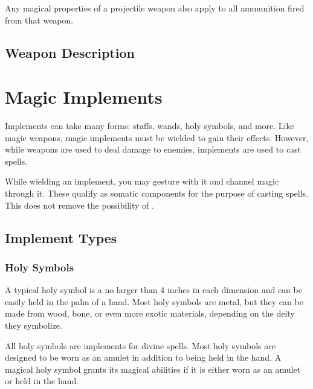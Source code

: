      Any magical properties of a projectile weapon also apply to all ammunition fired from that weapon.

    \subsection{Weapon Description}

        

        

\section{Magic Implements}\label{Implements}

    Implements can take many forms: staffs, wands, holy symbols, and more.
    Like magic weapons, magic implements must be wielded to gain their effects.
    However, while weapons are used to deal damage to enemies, implements are used to cast spells.

     While wielding an implement, you may gesture with it and channel magic through it.
    These qualify as somatic components for the purpose of casting spells.
    This does not remove the possibility of .

    \subsection{Implement Types}

        \subsubsection{Holy Symbols}

             A typical holy symbol is a no larger than 4 inches in each dimension and can be easily held in the palm of a hand.
            Most holy symbols are metal, but they can be made from wood, bone, or even more exotic materials, depending on the deity they symbolize.

             All holy symbols are implements for divine spells.
            Most holy symbols are designed to be worn as an amulet in addition to being held in the hand.
            A magical holy symbol grants its magical abilities if it is either worn as an amulet or held in the hand.

